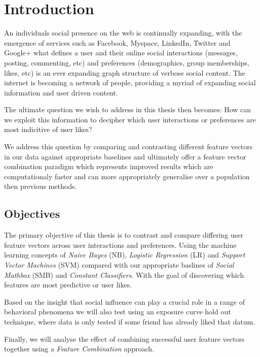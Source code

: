 
\chapter{Introduction}
\label{cha:intro}

An individuals social presence on the web is continually expanding, with the emergence of services such as Facebook, Myspace, LinkedIn, Twitter 
and Google+ what defines a user and their online social interactions (messages, posting, commenting, etc) and preferences 
(demographics, group memberships, likes, etc) is an ever expanding graph structure of verbose social content. The internet is becoming a network 
of people, providing a myriad of expanding social information and user driven content.

The ultimate question we wish to address in this thesis then becomes: 
How can we exploit this information to decipher which user interactions or preferences are most indicitive of user likes? 

We address this question by comparing and contrasting different feature vectors in our data against appropriate baselines and 
ultimately offer a feature vector combination paradigm which represents improved results which are computationaly faster and can more 
appropriately generalise over a population then previous methods.

\section{Objectives}
\label{sec:objectives}

The primary objective of this thesis is to contrast and compare differing user feature vectors across user interactions and preferences. 
Using the machine learning concepts of \emph{Naive Bayes} (NB), \emph{Logistic Regression} (LR) and \emph{Support Vector Machines} (SVM) compared with our 
appropriate baslines of \emph{Social Mathbox} (SMB) and \emph{Constant Classifiers}. With the goal of discovering which features are most predictive 
or user likes.

Based on the insight that social inﬂuence can play a crucial role in a range of behavioral phenomena \cite{grano,watts} we will also test 
using an exposure curve \cite{Romero2011hashtag} hold out technique, where data is only tested if some friend has already liked that datum. 

Finally, we will analyse the effect of combining successful user feature vectors together using a \emph{Feature Combination} approach.

